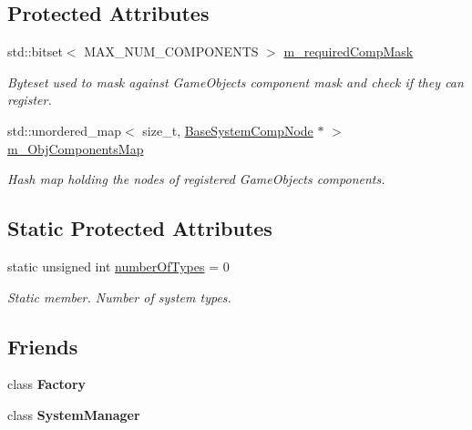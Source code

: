 \subsection*{Protected Attributes}
\begin{DoxyCompactItemize}
\item 
\mbox{\label{classBaseSystem_ab0f0418b57f4f6fdfb12fa6f317c1921}} 
std\+::bitset$<$ M\+A\+X\+\_\+\+N\+U\+M\+\_\+\+C\+O\+M\+P\+O\+N\+E\+N\+TS $>$ \hyperlink{classBaseSystem_ab0f0418b57f4f6fdfb12fa6f317c1921}{m\+\_\+required\+Comp\+Mask}
\begin{DoxyCompactList}\small\item\em Byteset used to mask against Game\+Objects component mask and check if they can register. \end{DoxyCompactList}\item 
\mbox{\label{classBaseSystem_a24b890d25ee0eeed44ef6976c7188224}} 
std\+::unordered\+\_\+map$<$ size\+\_\+t, \hyperlink{structBaseSystemCompNode}{Base\+System\+Comp\+Node} $\ast$ $>$ \hyperlink{classBaseSystem_a24b890d25ee0eeed44ef6976c7188224}{m\+\_\+\+Obj\+Components\+Map}
\begin{DoxyCompactList}\small\item\em Hash map holding the nodes of registered Game\+Objects components. \end{DoxyCompactList}\end{DoxyCompactItemize}
\subsection*{Static Protected Attributes}
\begin{DoxyCompactItemize}
\item 
\mbox{\label{classBaseSystem_a7ef356edab3cfb02905e0a73a645b131}} 
static unsigned int \hyperlink{classBaseSystem_a7ef356edab3cfb02905e0a73a645b131}{number\+Of\+Types} = 0
\begin{DoxyCompactList}\small\item\em Static member. Number of system types. \end{DoxyCompactList}\end{DoxyCompactItemize}
\subsection*{Friends}
\begin{DoxyCompactItemize}
\item 
\mbox{\label{classBaseSystem_a328c093d609680cca505905c6d49901a}} 
class {\bfseries Factory}
\item 
\mbox{\label{classBaseSystem_ab1ef2aa9992dd8ae85793e1a1f980e1e}} 
class {\bfseries System\+Manager}
\end{DoxyCompactItemize}


